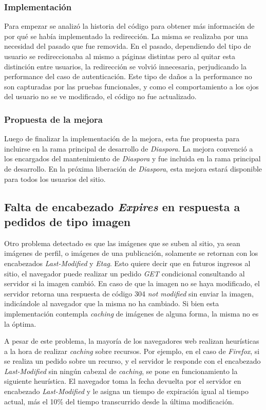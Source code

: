 \subsubsection{Implementación}

Para empezar se analizó la historia del código para obtener más información de por qué se había implementado la redirección. La misma se realizaba por una necesidad del
pasado que fue removida. En el pasado, dependiendo del tipo de usuario se redireccionaba al mismo a páginas distintas pero al quitar esta distinción entre usuarios, la redirección
se volvió innecesaria, perjudicando la performance del caso de autenticación. Este tipo de daños a la performance no son capturadas por las pruebas funcionales, y como el
comportamiento a los ojos del usuario no se ve modificado, el código no fue actualizado.

\subsubsection{Propuesta de la mejora}

Luego de finalizar la implementación de la mejora, esta fue propuesta para incluirse en la rama principal de desarrollo de \emph{Diaspora}. La mejora convenció a los encargados del
mantenimiento de \emph{Diaspora} y fue incluida en la rama principal de desarrollo. En la próxima liberación de \emph{Diaspora}, esta mejora estará disponible para todos los 
usuarios del sitio.

\subsection{Falta de encabezado \emph{Expires} en respuesta a pedidos de tipo imagen}

Otro problema detectado es que las imágenes que se suben al sitio, ya sean imágenes de perfil, o imágenes de una publicación, solamente se retornan con los encabezados
\emph{Last-Modified} y \emph{Etag}. Esto quiere decir que en futuros ingresos al sitio, el navegador puede realizar un pedido \emph{GET} condicional consultando al servidor si la
imagen cambió. En caso de que la imagen no se haya modificado, el servidor retorna una respuesta de código 304 \emph{not modified} sin enviar la imagen, indicándole al
navegador que la misma no ha cambiado. Si bien esta implementación contempla \emph{caching} de imágenes de alguna forma, la misma no es la óptima.

A pesar de este problema, la mayoría de los navegadores web realizan heurísticas a la hora de realizar \emph{caching} sobre recursos. Por ejemplo, en el caso de \emph{Firefox},
si se realiza un pedido sobre un recurso, y el servidor le responde con el encabezado \emph{Last-Modified} sin ningún cabezal de \emph{caching}, se pone en funcionamiento la
siguiente heurística. El navegador toma la fecha devuelta por el servidor en encabezado \emph{Last-Modified} y le asigna un tiempo de expiración igual al tiempo actual, más
el 10\% del tiempo transcurrido desde la última modificación. 

